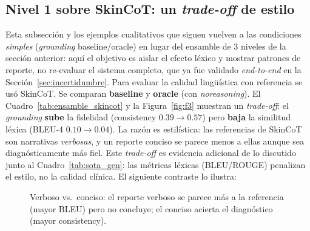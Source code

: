 \documentclass[11pt, a4paper]{article}
\begin{document}
\subsection{Nivel 1 sobre SkinCoT: un \emph{trade-off} de estilo}
\label{sec:skincot}
Esta subsección y los ejemplos cualitativos que siguen vuelven a las condiciones \emph{simples}
(\emph{grounding} baseline/oracle) en lugar del ensamble de 3 niveles de la sección anterior: aquí el
objetivo es aislar el efecto léxico y mostrar patrones de reporte, no re-evaluar el sistema completo, que
ya fue validado \emph{end-to-end} en la Sección~\ref{sec:incertidumbre}. Para evaluar la calidad
lingüística con referencia se usó SkinCoT. Se comparan \textbf{baseline} y
\textbf{oracle} (con \emph{noreasoning}). El Cuadro~\ref{tab:ensamble_skincot} y la Figura~\ref{fig:f3}
muestran un \emph{trade-off}: el \emph{grounding} \textbf{sube} la fidelidad (consistency $0.39 \rightarrow 0.57$)
pero \textbf{baja} la similitud léxica (BLEU-4 $0.10 \rightarrow 0.04$). La razón es estilística: las
referencias de SkinCoT son narrativas \emph{verbosas}, y un reporte conciso se parece menos a ellas
aunque sea diagnósticamente más fiel. Este \emph{trade-off} es evidencia adicional de lo discutido junto al
Cuadro~\ref{tab:sota_gen}: las métricas léxicas (BLEU/ROUGE) penalizan el estilo, no la calidad clínica.
El siguiente contraste lo ilustra:

\begin{figure}[H]
\centering
{}
\caption{Verboso vs.\ conciso: el reporte verboso se parece más a la referencia (mayor BLEU) pero no
concluye; el conciso acierta el diagnóstico (mayor consistency).}
\label{fig:verboso}
\end{figure}
\end{document}

